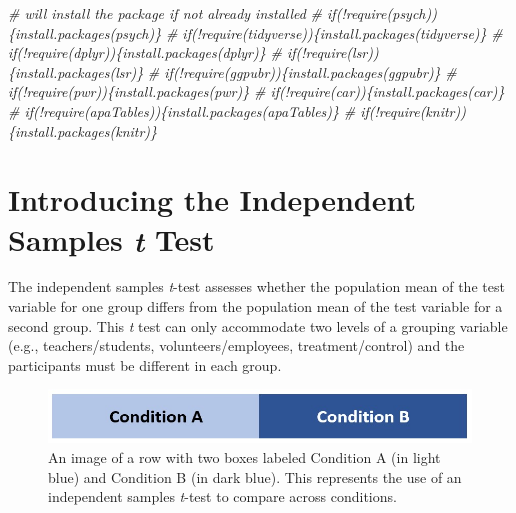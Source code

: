 \documentclass[
  11pt,
]{book}
\newenvironment{Shaded}{\begin{snugshade}}{\end{snugshade}}
\newcommand{\CommentTok}[1]{\textcolor[rgb]{0.56,0.35,0.01}{\textit{#1}}}
\begin{document}
\begin{Shaded}
\begin{Highlighting}[]
\CommentTok{\# will install the package if not already installed}
\CommentTok{\# if(!require(psych))\{install.packages(\textquotesingle{}psych\textquotesingle{})\}}
\CommentTok{\# if(!require(tidyverse))\{install.packages(\textquotesingle{}tidyverse\textquotesingle{})\}}
\CommentTok{\# if(!require(dplyr))\{install.packages(\textquotesingle{}dplyr\textquotesingle{})\}}
\CommentTok{\# if(!require(lsr))\{install.packages(\textquotesingle{}lsr\textquotesingle{})\}}
\CommentTok{\# if(!require(ggpubr))\{install.packages(\textquotesingle{}ggpubr\textquotesingle{})\}}
\CommentTok{\# if(!require(pwr))\{install.packages(\textquotesingle{}pwr\textquotesingle{})\}}
\CommentTok{\# if(!require(car))\{install.packages(\textquotesingle{}car\textquotesingle{})\}}
\CommentTok{\# if(!require(apaTables))\{install.packages(\textquotesingle{}apaTables\textquotesingle{})\}}
\CommentTok{\# if(!require(knitr))\{install.packages(\textquotesingle{}knitr\textquotesingle{})\}}
\end{Highlighting}
\end{Shaded}

\hypertarget{introducing-the-independent-samples-t-test}{%
\section{\texorpdfstring{Introducing the Independent Samples \emph{t} Test}{Introducing the Independent Samples t Test}}\label{introducing-the-independent-samples-t-test}}

The independent samples \emph{t}-test assesses whether the population mean of the test variable for one group differs from the population mean of the test variable for a second group. This \emph{t} test can only accommodate two levels of a grouping variable (e.g., teachers/students, volunteers/employees, treatment/control) and the participants must be different in each group.

\begin{figure}
\centering
\includegraphics{images/ttests/conditions_paired.jpg}
\caption{An image of a row with two boxes labeled Condition A (in light blue) and Condition B (in dark blue). This represents the use of an independent samples \emph{t}-test to compare across conditions.}
\end{figure}
\end{document}
